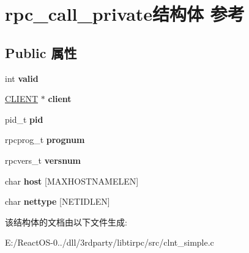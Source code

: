 \hypertarget{structrpc__call__private}{}\section{rpc\+\_\+call\+\_\+private结构体 参考}
\label{structrpc__call__private}
\subsection*{Public 属性}
\begin{DoxyCompactItemize}
\item 
\mbox{\label{structrpc__call__private_a23646cf0827eead0df27e4c46e1af493}} 
int {\bfseries valid}
\item 
\mbox{\label{structrpc__call__private_af8c50249d62068ae0755ea7c9dd24f53}} 
\hyperlink{struct____rpc__client}{C\+L\+I\+E\+NT} $\ast$ {\bfseries client}
\item 
\mbox{\label{structrpc__call__private_a3f050d97a47cc053f275d30eda92fd2e}} 
pid\+\_\+t {\bfseries pid}
\item 
\mbox{\label{structrpc__call__private_aca3bbf686a0855f10f8421669dd8231e}} 
rpcprog\+\_\+t {\bfseries prognum}
\item 
\mbox{\label{structrpc__call__private_a9f5ad0c690d8d4731049a9ffb39e35c3}} 
rpcvers\+\_\+t {\bfseries versnum}
\item 
\mbox{\label{structrpc__call__private_a2b2d478892d7fd6db75359c81e599bb6}} 
char {\bfseries host} \mbox{[}M\+A\+X\+H\+O\+S\+T\+N\+A\+M\+E\+L\+EN\mbox{]}
\item 
\mbox{\label{structrpc__call__private_a41870dd123d6d1b340c73b163067791f}} 
char {\bfseries nettype} \mbox{[}N\+E\+T\+I\+D\+L\+EN\mbox{]}
\end{DoxyCompactItemize}


该结构体的文档由以下文件生成\+:\begin{DoxyCompactItemize}
\item 
E\+:/\+React\+O\+S-\/0../dll/3rdparty/libtirpc/src/clnt\+\_\+simple.\+c\end{DoxyCompactItemize}
